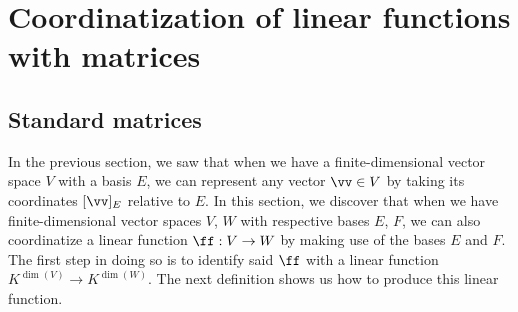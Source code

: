 \newpage

\section{Coordinatization of linear functions with matrices}
\label{ch::lin_alg::section::coordinatization_of_linear functions}

\subsection*{Standard matrices}

In the previous section, we saw that when we have a finite-dimensional vector space $V$ with a basis $E$, we can represent any vector $\vv \in V$ by taking its coordinates $[\vv]_E$ relative to $E$. In this section, we discover that when we have finite-dimensional vector spaces $V$, $W$ with respective bases $E$, $F$, we can also coordinatize a linear function $\ff:V \rightarrow W$ by making use of the bases $E$ and $F$. The first step in doing so is to identify said $\ff$ with a linear function $K^{\dim(V)} \rightarrow K^{\dim(W)}$. The next definition shows us how to produce this linear function.

